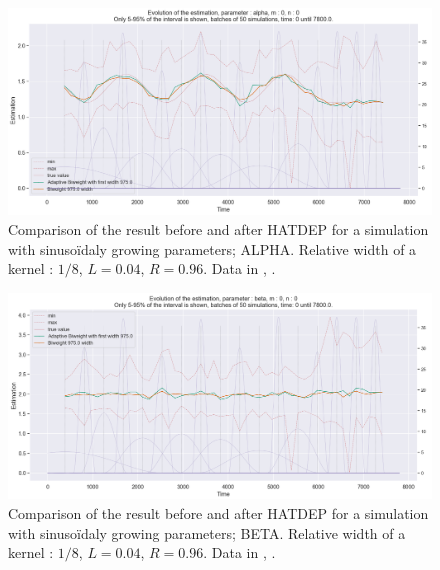 \begin{figure}
\centering
\includegraphics[width = 0.90 \textwidth]{../imag/chap3/4_bis/P.png}
\caption{Comparison of the result before and after HATDEP for a simulation with sinusoïdaly growing parameters; ALPHA. Relative width of a kernel : $1/8$, $L = 0.04$, $R = 0.96$. Data in \protect {}, \protect {}.}
\label{fig:second_estimate_4_alpha}
\end{figure}

\begin{figure}
\centering
\includegraphics[width = 0.90 \textwidth]{../imag/chap3/4_bis/Q.png}
\caption{Comparison of the result before and after HATDEP for a simulation with sinusoïdaly growing parameters; BETA. Relative width of a kernel : $1/8$, $L = 0.04$, $R = 0.96$. Data in \protect {}, \protect {}.}
\label{fig:second_estimate_4_beta}
\end{figure}

